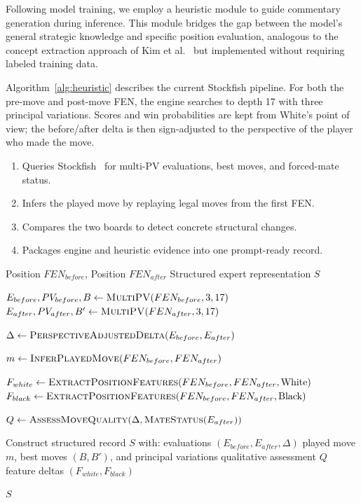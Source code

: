 \documentclass[sigconf,nonacm]{acmart}
\begin{document}
Following model training, we employ a heuristic module to guide commentary generation during inference. This module bridges the gap between the model's general strategic knowledge and specific position evaluation, analogous to the concept extraction approach of Kim et al.~\cite{kim2025ccc} but implemented without requiring labeled training data.

Algorithm~\ref{alg:heuristic} describes the current Stockfish pipeline. For both the pre-move and post-move FEN, the engine searches to depth 17 with three principal variations. Scores and win probabilities are kept from White's point of view; the before/after delta is then sign-adjusted to the perspective of the player who made the move.

\begin{enumerate}
    \item Queries Stockfish~\cite{stockfish} for multi-PV evaluations, best moves, and forced-mate status.
    \item Infers the played move by replaying legal moves from the first FEN.
    \item Compares the two boards to detect concrete structural changes.
    \item Packages engine and heuristic evidence into one prompt-ready record.
\end{enumerate}

\begin{algorithm}[htbp]
\caption{Expert-Guided Move Evaluation with Structural Feature Extraction}
\label{alg:heuristic}
\small
\begin{algorithmic}[1]
\Require Position $FEN_{before}$, Position $FEN_{after}$
\Ensure Structured expert representation $S$

\State $E_{before},PV_{before},B \gets \textsc{MultiPV}(FEN_{before},3,17)$
\State $E_{after},PV_{after},B' \gets \textsc{MultiPV}(FEN_{after},3,17)$

\State $\Delta \gets \textsc{PerspectiveAdjustedDelta}(E_{before}, E_{after})$

\State $m \gets \textsc{InferPlayedMove}(FEN_{before}, FEN_{after})$

\State $F_{white} \gets \textsc{ExtractPositionFeatures}(FEN_{before}, FEN_{after}, \text{White})$
\State $F_{black} \gets \textsc{ExtractPositionFeatures}(FEN_{before}, FEN_{after}, \text{Black})$

\State $Q \gets \textsc{AssessMoveQuality}(\Delta, \textsc{MateStatus}(E_{after}))$

\State Construct structured record $S$ with:
\Statex \quad evaluations $(E_{before}, E_{after}, \Delta)$
\Statex \quad played move $m$, best moves $(B,B')$, and principal variations
\Statex \quad qualitative assessment $Q$
\Statex \quad feature deltas $(F_{white}, F_{black})$

\State \Return $S$
\end{algorithmic}
\end{algorithm}
\end{document}
